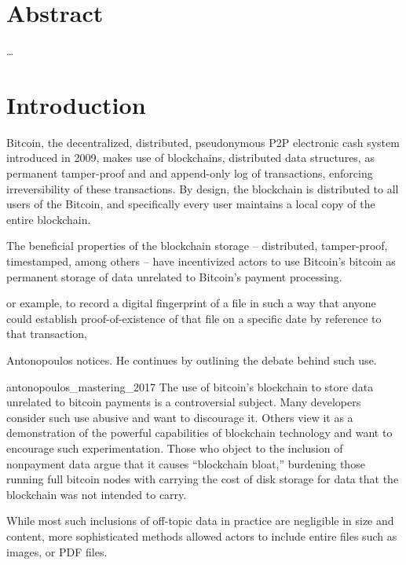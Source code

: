 \documentclass[a4paper,11pt,titlepage]{scrbook}
\newcommand{\blankpage}{
 \clearpage{\pagestyle{empty}\cleardoublepage}
}
\begin{document}
\frontmatter
{}

\setmarginsrb{3cm}{1cm}{3cm}{1cm}{6mm}{7mm}{5mm}{15mm}
\chapter*{Abstract}
\dots

\tableofcontents
\blankpage

\mainmatter
{}
\chapter{Introduction}

Bitcoin, the decentralized, distributed, pseudonymous P2P electronic cash system introduced in 2009, makes use of blockchains, distributed data structures, as permanent tamper-proof and and append-only log of transactions, enforcing irreversibility of these transactions.
By design, the blockchain is distributed to all users of the Bitcoin, and specifically every user maintains a local copy of the entire blockchain. \cite[Cf.][]{nakamoto_bitcoin_2008}

The beneficial properties of the blockchain storage – distributed, tamper-proof, timestamped, among others – have incentivized actors to use Bitcoin's bitcoin as permanent storage of data unrelated to Bitcoin's payment processing.
\begin{displayquote}
    or example, to record a digital fingerprint
    of a file in such a way that anyone could establish proof-of-existence of that file on a specific date by reference to that transaction,
\end{displayquote}
Antonopoulos notices. He continues by outlining the debate behind such use.
\begin{displaycquote}{antonopoulos_mastering_2017}
    The use of bitcoin’s blockchain to store data unrelated to bitcoin payments is a controversial subject.
    Many developers consider such use abusive and want to discourage it.
    Others view it as a demonstration of the powerful capabilities of blockchain technology and want to encourage such experimentation. Those who object to the inclusion of nonpayment data argue that it causes \enquote{blockchain bloat,} burdening those running full bitcoin nodes with carrying the cost of disk storage for data that the blockchain was not intended to carry.
\end{displaycquote}
While most such inclusions of off-topic data in practice are negligible in size and content, more sophisticated methods allowed actors to include entire files such as images, or PDF files. \cite{matzutt_quantitative_2018}
\end{document}

